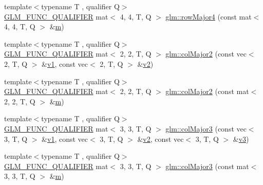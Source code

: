 \begin{DoxyCompactItemize}
\item 
{\footnotesize template$<$typename T , qualifier Q$>$ }\\\mbox{\hyperlink{setup_8hpp_a33fdea6f91c5f834105f7415e2a64407}{G\+L\+M\+\_\+\+F\+U\+N\+C\+\_\+\+Q\+U\+A\+L\+I\+F\+I\+ER}} mat$<$ 4, 4, T, Q $>$ \mbox{\hyperlink{group__gtx__matrix__major__storage_gac92ad1c2acdf18d3eb7be45a32f9566b}{glm\+::row\+Major4}} (const mat$<$ 4, 4, T, Q $>$ \&\mbox{\hyperlink{_s_d_l__opengl__glext_8h_af593500c283bf1a787a6f947f503a5c2}{m}})
\item 
{\footnotesize template$<$typename T , qualifier Q$>$ }\\\mbox{\hyperlink{setup_8hpp_a33fdea6f91c5f834105f7415e2a64407}{G\+L\+M\+\_\+\+F\+U\+N\+C\+\_\+\+Q\+U\+A\+L\+I\+F\+I\+ER}} mat$<$ 2, 2, T, Q $>$ \mbox{\hyperlink{group__gtx__matrix__major__storage_gaaff72f11286e59a4a88ed21a347f284c}{glm\+::col\+Major2}} (const vec$<$ 2, T, Q $>$ \&\mbox{\hyperlink{_s_d_l__opengl__glext_8h_a435c176a02c061b43e19bdf7c86cceae}{v1}}, const vec$<$ 2, T, Q $>$ \&\mbox{\hyperlink{_s_d_l__opengl__glext_8h_a0928f6d0f0f794ba000a21dfae422136}{v2}})
\item 
{\footnotesize template$<$typename T , qualifier Q$>$ }\\\mbox{\hyperlink{setup_8hpp_a33fdea6f91c5f834105f7415e2a64407}{G\+L\+M\+\_\+\+F\+U\+N\+C\+\_\+\+Q\+U\+A\+L\+I\+F\+I\+ER}} mat$<$ 2, 2, T, Q $>$ \mbox{\hyperlink{group__gtx__matrix__major__storage_gafc25fd44196c92b1397b127aec1281ab}{glm\+::col\+Major2}} (const mat$<$ 2, 2, T, Q $>$ \&\mbox{\hyperlink{_s_d_l__opengl__glext_8h_af593500c283bf1a787a6f947f503a5c2}{m}})
\item 
{\footnotesize template$<$typename T , qualifier Q$>$ }\\\mbox{\hyperlink{setup_8hpp_a33fdea6f91c5f834105f7415e2a64407}{G\+L\+M\+\_\+\+F\+U\+N\+C\+\_\+\+Q\+U\+A\+L\+I\+F\+I\+ER}} mat$<$ 3, 3, T, Q $>$ \mbox{\hyperlink{group__gtx__matrix__major__storage_ga1e25b72b085087740c92f5c70f3b051f}{glm\+::col\+Major3}} (const vec$<$ 3, T, Q $>$ \&\mbox{\hyperlink{_s_d_l__opengl__glext_8h_a435c176a02c061b43e19bdf7c86cceae}{v1}}, const vec$<$ 3, T, Q $>$ \&\mbox{\hyperlink{_s_d_l__opengl__glext_8h_a0928f6d0f0f794ba000a21dfae422136}{v2}}, const vec$<$ 3, T, Q $>$ \&\mbox{\hyperlink{_s_d_l__opengl__glext_8h_acc806b31cbf466ceba6555983d8b814d}{v3}})
\item 
{\footnotesize template$<$typename T , qualifier Q$>$ }\\\mbox{\hyperlink{setup_8hpp_a33fdea6f91c5f834105f7415e2a64407}{G\+L\+M\+\_\+\+F\+U\+N\+C\+\_\+\+Q\+U\+A\+L\+I\+F\+I\+ER}} mat$<$ 3, 3, T, Q $>$ \mbox{\hyperlink{group__gtx__matrix__major__storage_ga86bd0656e787bb7f217607572590af27}{glm\+::col\+Major3}} (const mat$<$ 3, 3, T, Q $>$ \&\mbox{\hyperlink{_s_d_l__opengl__glext_8h_af593500c283bf1a787a6f947f503a5c2}{m}})

\end{DoxyCompactItemize}

